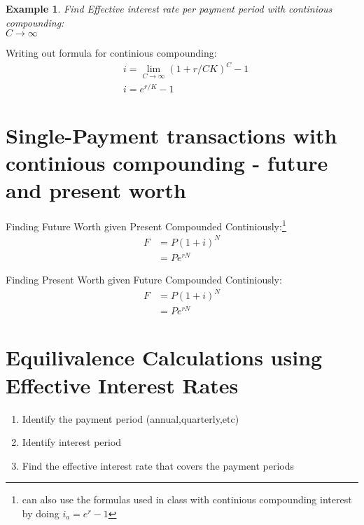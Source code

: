 \documentclass{report} %
\newtheorem{exmp}{Example}
\begin{document}
\begin{exmp}
    Find Effective interest rate per payment period with continious compounding: \\
    $C \rightarrow \infty$
\end{exmp}
Writing out formula for continious compounding:
\begin{equation*}
    \begin{aligned}
        &i = \lim_{C \rightarrow \infty}(1+r/CK)^C - 1 \\
        &i = e^{r/K} - 1
    \end{aligned}
\end{equation*}

\section*{Single-Payment transactions with continious compounding - future and present worth}

Finding Future Worth given Present Compounded Continiously:\footnote{can also use the formulas used in class with continious compounding interest by doing $i_a = e^r-1$}
\begin{equation*}
    \begin{aligned}
        F &= P(1+i)^N \\
          &= Pe^{rN}
    \end{aligned}
\end{equation*}

Finding Present Worth given Future Compounded Continiously:
\begin{equation*}
    \begin{aligned}
        F &= P(1+i)^N \\
          &= Pe^{rN}
    \end{aligned}
\end{equation*}

\section*{Equilivalence Calculations using Effective Interest Rates}
\begin{enumerate}
    \item Identify the payment period (annual,quarterly,etc)
    \item Identify interest period
    \item Find the effective interest rate that covers the payment periods
\end{enumerate}
\end{document}
